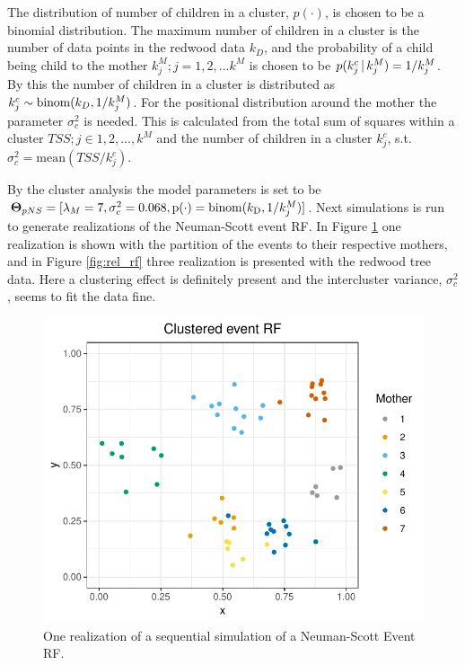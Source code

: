 The distribution of number of children in a cluster, $p(\cdot)$, is chosen to be a binomial distribution. The maximum number of children in a cluster is the number of data points in the redwood data $k_D$, and the probability of a child being child to the mother $k_j^M;j=1,2,...k^M$ is chosen to be $p(k_j^c \, | \, k_j^M) = 1/k_j^M$. By this the number of children in a cluster is distributed as $k_j^c \sim \mathrm{binom}(k_D,1/k_j^M)$. For the positional distribution around the mother the parameter $\sigma_c^2$ is needed. This is calculated from the total sum of squares within a cluster $TSS; j\in 1,2,...,k^M$ and the number of children in a cluster $k_j^c$, s.t. $\sigma_c^2 = \mathrm{mean}(TSS/k_j^c)$.

By the cluster analysis the model parameters is set to be $\bm{\Theta}_{pNS} = [\lambda_M = 7, \sigma_c^2 = 0.068, \mathrm{p}(\cdot) = \mathrm{binom}(k_\textrm{D},1/k_j^M)]$. Next simulations is run to generate realizations of the Neuman-Scott event RF. In Figure \ref{fig:cluster_event_rf} one realization is shown with the partition of the events to their respective mothers, and in Figure \ref{fig:rel_rf} three realization is presented with the redwood tree data. Here a clustering effect is definitely present and the intercluster variance, $\sigma_c^2$, seems to fit the data fine. 

\begin{figure}
    \centering
    \includegraphics[scale=0.9]{figures/cluster_event_rf.pdf}
    \caption{One realization of a sequential simulation of a Neuman-Scott Event RF.}
    \label{fig:cluster_event_rf}
\end{figure}

